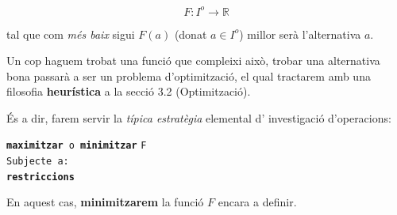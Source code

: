 \documentclass[10pt,twocolumn]{article}
\newcommand{\R}{\ensuremath{\mathbb{R}}}
\begin{document}
$$F: I^o \longrightarrow \R$$

tal que com \textit{més baix} sigui $F(a)$ (donat $a \in I^o$) millor serà l'alternativa $a$.

Un cop haguem trobat una funció que compleixi això, trobar una alternativa bona passarà a ser un problema d'optimització, el qual tractarem amb una filosofia \textbf{heurística} a la secció 3.2 (Optimització).

És a dir, farem servir la \textit{típica estratègia} elemental d' investigació d'operacions:
\vspace{3 mm}

\begin{tcolorbox}
	\texttt{\textbf{maximitzar} o \textbf{minimitzar}} \texttt{F}
	\\ 
	\texttt{Subjecte a:}
	\\
	\text{ } \hspace{10mm} \texttt{\textbf{restriccions}}
\end{tcolorbox}
En aquest cas, \textbf{minimitzarem} la funció $F$ encara a definir.
\vspace{3mm}
\end{document}
